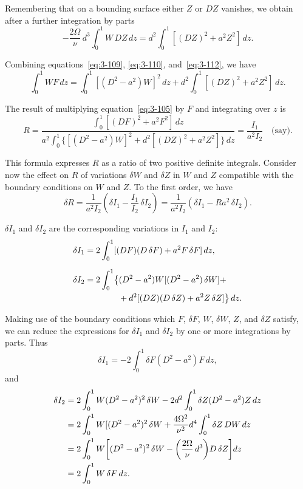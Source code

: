 Remembering that on a bounding surface either $Z$ or $DZ$ vanishes, we obtain after a further integration by parts
\begin{equation}\label{eq:3-112}
-\frac{2\Omega}{\nu}\,d^3\int_0^1 W\,DZ\,dz = d^2 \int_0^1 [(DZ)^2 + a^2 Z^2]\,dz.
\end{equation}

Combining equations~\eqref{eq:3-109}, \eqref{eq:3-110}, and~\eqref{eq:3-112}, we have
\begin{equation}\label{eq:3-113}
\int_0^1 W F\,dz = \int_0^1 [(D^2 - a^2)W]^2\,dz + d^2 \int_0^1 [(DZ)^2 + a^2 Z^2]\,dz.
\end{equation}

The result of multiplying equation~\eqref{eq:3-105} by $F$ and integrating over $z$ is
\begin{equation}\label{eq:3-114}
R = \frac{\displaystyle\int_0^1 [(DF)^2 + a^2 F^2]\,dz}{a^2\displaystyle\int_0^1\bigl\{[(D^2 - a^2)W]^2 + d^2[(DZ)^2 + a^2 Z^2]\bigr\}\,dz} = \frac{I_1}{a^2 I_2} \quad \text{(say)}.
\end{equation}

This formula expresses $R$ as a ratio of two positive definite integrals. Consider now the effect on $R$ of variations $\delta W$ and $\delta Z$ in $W$ and $Z$ compatible with the boundary conditions on $W$ and $Z$. To the first order, we have
\begin{equation}\label{eq:3-115}
\delta R = \frac{1}{a^2 I_2}\!\left(\delta I_1 - \frac{I_1}{I_2}\,\delta I_2\right) = \frac{1}{a^2 I_2}(\delta I_1 - Ra^2\,\delta I_2).
\end{equation}

$\delta I_1$ and $\delta I_2$ are the corresponding variations in $I_1$ and $I_2$:
\begin{align}
\delta I_1 &= 2\int_0^1 [(DF)(D\,\delta F) + a^2 F\,\delta F]\,dz, \notag\\[6pt]
\delta I_2 &= 2\int_0^1 \bigl\{(D^2 - a^2)W [(D^2 - a^2)\,\delta W] + \notag\\
&\qquad\qquad + d^2[(DZ)(D\,\delta Z) + a^2 Z\,\delta Z]\bigr\}\,dz. \label{eq:3-116}
\end{align}

Making use of the boundary conditions which $F$, $\delta F$, $W$, $\delta W$, $Z$, and $\delta Z$ satisfy, we can reduce the expressions for $\delta I_1$ and $\delta I_2$ by one or more integrations by parts. Thus
\begin{equation}\label{eq:3-117}
\delta I_1 = -2\int_0^1 \delta F(D^2 - a^2)F\,dz,
\end{equation}
and
\begin{align}
\delta I_2 &= 2\int_0^1 W(D^2 - a^2)^2\,\delta W - 2d^2\int_0^1 \delta Z(D^2 - a^2)Z\,dz \notag\\
&= 2\int_0^1 W[(D^2 - a^2)^2\,\delta W + \frac{4\Omega^2}{\nu^2}d^4\int_0^1 \delta Z\,DW\,dz \notag\\
&= 2\int_0^1 W\!\left[(D^2 - a^2)^2\,\delta W - \left(\frac{2\Omega}{\nu}\,d^3\right)\!D\,\delta Z\right]\!dz \label{eq:3-118}\\
&= 2\int_0^1 W\,\delta F\,dz. \notag
\end{align}


